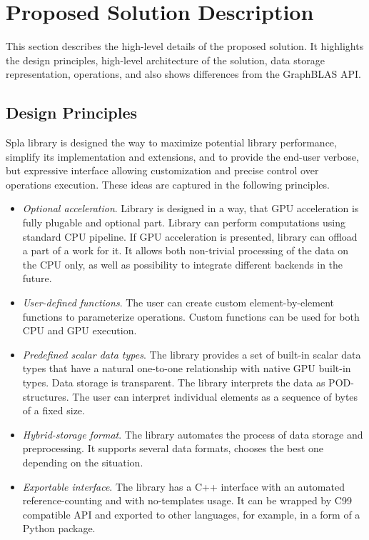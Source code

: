 \section{Proposed Solution Description}

This section describes the high-level details of the proposed solution. 
It highlights the design principles, high-level architecture of the solution, data storage representation, operations, and also shows differences from the GraphBLAS API.

\subsection{Design Principles}

Spla library is designed the way to maximize potential library performance, simplify its implementation and extensions, and to provide the end-user verbose, but expressive interface allowing customization and precise control over operations execution. 
These ideas are captured in the following principles.

\begin{itemize}
    \item \textit{Optional acceleration}. Library is designed in a way, that GPU acceleration is fully plugable and optional part. Library can perform computations using standard CPU pipeline. If GPU acceleration is presented, library can offload a part of a work for it. It allows both non-trivial processing of the data on the CPU only, as well as possibility to integrate different backends in the future.  
    \item \textit{User-defined functions}. The user can create custom element-by-element functions to parameterize operations. Custom functions can be used for both CPU and GPU execution.
    \item \textit{Predefined scalar data types}. The library provides a set of built-in scalar data types that have a natural one-to-one relationship with native GPU built-in types. Data storage is transparent. The library interprets the data as POD-structures. The user can interpret individual elements as a sequence of bytes of a fixed size.
    \item \textit{Hybrid-storage format}. The library automates the process of data storage and preprocessing. It supports several data formats, chooses the best one depending on the situation.
    \item \textit{Exportable interface}. The library has a C++ interface with an automated reference-counting and with no-templates usage. It can be wrapped by C99 compatible API and exported to other languages, for example, in a form of a Python package.
\end{itemize}

